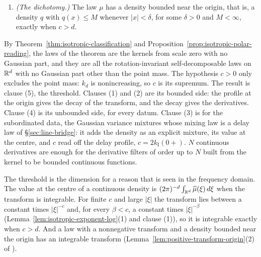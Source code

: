 \begin{theorem}
\begin{enumerate}
representative $q$ of a density of $\mu$, every $\delta > 0$ and every $M$ there is an $x$ with
$0 < |x| < \delta$ and $q(x) > M$. Quantitatively, with $g_t$ the heat kernel of
Lemma~\ref{lem:positive-transform-origin}, there is $C > 0$ with
\[
  \int_{\RR^d} g_t\,d\mu \ge C\,t^{-(d-c)/2} \quad (c < d), \qquad
  \int_{\RR^d} g_t\,d\mu \ge C\,\log\frac1t \quad (c = d), \qquad 0 < t \le 1 ,
\]
and for every $\beta$ with $0 < \beta < c$ there is $C'_\beta$ with
$\int g_t\,d\mu \le C'_\beta\,t^{-(d-\beta)/2}$ for all $t > 0$. And
$\log\int g_t\,d\mu / \log(1/t) \to (d-c)/2$ as $t \downarrow 0$.
\item \emph{(The dichotomy.)} The law $\mu$ has a density bounded near the origin, that is, a
density $q$ with $q(x) \le M$ whenever $|x| < \delta$, for some $\delta > 0$ and $M < \infty$,
exactly when $c > d$.
\end{enumerate}
\end{theorem}

By Theorem~\ref{thm:isotropic-classification} and
Proposition~\ref{prop:isotropic-polar-reading}, the laws of the theorem are the kernels from scale
zero with no Gaussian part, and they are all the rotation-invariant self-decomposable laws on
$\mathbb{R}^d$ with no Gaussian part other than the point mass. The hypothesis $c > 0$ only
excludes the point mass: $k_d$ is nonincreasing, so $c$ is its supremum. The result is clause
(5), the threshold. Clauses (1) and (2) are its bounded side: the profile at the origin gives
the decay of the transform, and the decay gives the derivatives. Clause (4) is its unbounded
side, for every datum. Clause (3) is for the subordinated data, the Gaussian variance mixtures
whose mixing law is a delay law of \S\ref{sec:line-bridge}: it adds the density as an explicit
mixture, its value at the centre, and $c$ read off the delay profile,
$c = 2k_{\mathrm I}(0{+})$. $N$ continuous derivatives are enough
for the derivative filters of order up to $N$ built from the kernel to be bounded continuous
functions.

The threshold is the dimension for a reason that is seen in the frequency domain. The value at
the centre of a continuous density is $(2\pi)^{-d}\int_{\mathbb{R}^d}\widehat\mu(\xi)\,d\xi$ when the
transform is integrable. For finite $c$ and large $|\xi|$ the transform lies between a constant
times $|\xi|^{-c}$ and, for every $\beta < c$, a constant times $|\xi|^{-\beta}$
(Lemma~\ref{lem:isotropic-exponent-log}(1) and clause (1)), so it is integrable exactly when
$c > d$. And a law with a nonnegative transform and a density bounded near the origin has an
integrable transform (Lemma~\ref{lem:positive-transform-origin}(2) of \suppl).

